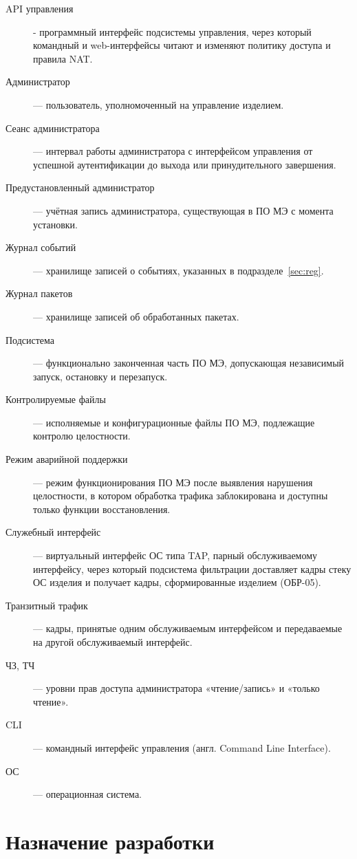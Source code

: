 \documentclass[12pt,a4paper,final]{article}
\providecommand{\textenglish}[1]{\foreignlanguage{english}{#1}}
\begin{document}
\begin{description}
\item[API управления] - программный интерфейс подсистемы управления, через
который командный и web-интерфейсы читают и изменяют политику доступа и
правила NAT.
\item[Администратор] — пользователь, уполномоченный на управление изделием.
\item[Сеанс администратора] — интервал работы администратора с интерфейсом управления
  от успешной аутентификации до выхода или принудительного завершения.
\item[Предустановленный администратор] — учётная запись администратора,
  существующая в ПО МЭ с момента установки.
\item[Журнал событий] — хранилище записей о событиях, указанных в подразделе~\ref{sec:reg}.
\item[Журнал пакетов] — хранилище записей об обработанных пакетах.
\item[Подсистема] — функционально законченная часть ПО МЭ, допускающая
  независимый запуск, остановку и перезапуск.
\item[Контролируемые файлы] — исполняемые и конфигурационные файлы ПО МЭ,
  подлежащие контролю целостности.
\item[Режим аварийной поддержки] — режим функционирования ПО МЭ после выявления
  нарушения целостности, в котором обработка трафика заблокирована и доступны
  только функции восстановления.
\item[Служебный интерфейс] — виртуальный интерфейс ОС типа TAP, парный
  обслуживаемому интерфейсу, через который подсистема фильтрации доставляет
  кадры стеку ОС изделия и получает кадры, сформированные изделием (ОБР-05).
\item[Транзитный трафик] — кадры, принятые одним обслуживаемым интерфейсом
  и передаваемые на другой обслуживаемый интерфейс.
\item[ЧЗ, ТЧ] — уровни прав доступа администратора «чтение/запись» и «только чтение».
\item[CLI] — командный интерфейс управления (англ. \textenglish{Command Line Interface}).
\item[ОС] — операционная система.
\end{description}
\newpage

\section{Назначение разработки}
\end{document}
